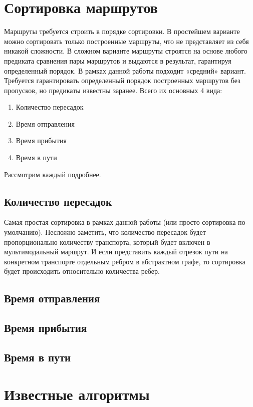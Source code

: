\section{Сортировка маршрутов}
Маршруты требуется строить в порядке сортировки. В простейшем варианте можно сортировать только построенные маршруты, что не представляет из себя никакой сложности. В сложном варианте маршруты строятся на основе любого предиката сравнения пары маршрутов и выдаются в результат, гарантируя определенный порядок. В рамках данной работы подходит «средний» вариант. Требуется гарантировать определенный порядок построенных маршрутов без пропусков, но предикаты известны заранее. Всего их основных 4 вида:
\begin{enumerate}
    \item Количество пересадок
    \item Время отправления
    \item Время прибытия
    \item Время в пути
\end{enumerate}

Рассмотрим каждый подробнее.

\subsection{Количество пересадок}
Самая простая сортировка в рамках данной работы (или просто сортировка по-умолчанию). Несложно заметить, что количество пересадок будет пропорционально количеству транспорта, который будет включен в мультимодальный маршрут. И если представить каждый отрезок пути на конкретном транспорте отдельным ребром в абстрактном графе, то сортировка будет происходить относительно количества ребер.
\subsection{Время отправления}

\subsection{Время прибытия}

\subsection{Время в пути}

\section{Известные алгоритмы}
